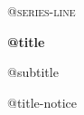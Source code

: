 \vspace*{0.13\textheight}
{\large\scshape @{series-line}\par}
\vspace{1.5em}
{\Huge\bfseries @{title}\par}
\vspace{0.9em}
{\Large @{subtitle}\par}
\vfill
{\footnotesize @{title-notice}\par}
\vspace{1.2em}
